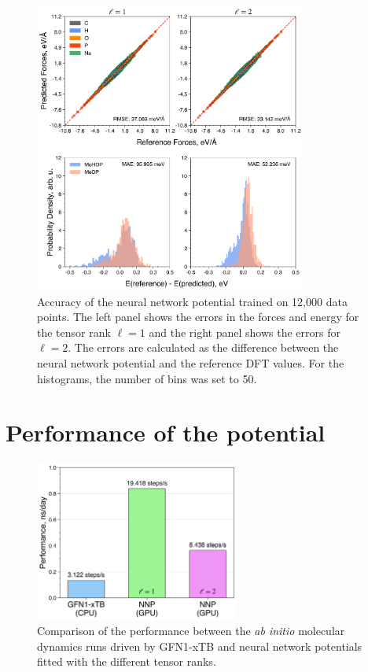 \begin{figure}[ht]
    \centering
    \includegraphics[width=0.8\textwidth]{Figures/4_Results/results_nnp_accuracy_l-1_l-2.png}
    \caption{Accuracy of the neural network potential trained on 12,000 data points. The left panel shows the errors in the forces and energy for the tensor rank $\ell=1$ and the right panel shows the errors for $\ell=2$. The errors are calculated as the difference between the neural network potential and the reference DFT values. For the histograms, the number of bins was set to 50.}
    \label{fig:nnp_accuracy}
\end{figure}



\clearpage
\section{Performance of the potential}

\begin{figure}[ht]
    \centering
    \includegraphics[width=0.6\textwidth]{Figures/4_Results/results_performance_comparison.png}
    \caption{Comparison of the performance between the \textit{ab initio} molecular dynamics runs driven by GFN1-xTB and neural network potentials fitted with the different tensor ranks.}
    \label{fig:performance_comparison}
\end{figure}


